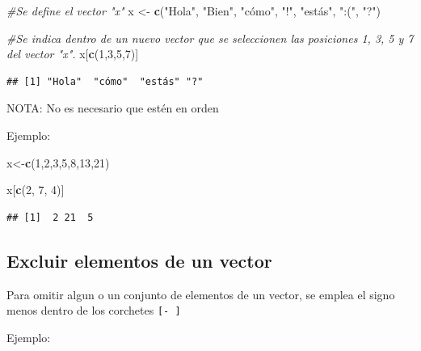\documentclass[
]{book}
\newenvironment{Shaded}{\begin{snugshade}}{\end{snugshade}}
\newcommand{\CommentTok}[1]{\textcolor[rgb]{0.56,0.35,0.01}{\textit{#1}}}
\newcommand{\DecValTok}[1]{\textcolor[rgb]{0.00,0.00,0.81}{#1}}
\newcommand{\FunctionTok}[1]{\textcolor[rgb]{0.13,0.29,0.53}{\textbf{#1}}}
\newcommand{\NormalTok}[1]{#1}
\newcommand{\OtherTok}[1]{\textcolor[rgb]{0.56,0.35,0.01}{#1}}
\newcommand{\StringTok}[1]{\textcolor[rgb]{0.31,0.60,0.02}{#1}}
\begin{document}
\begin{Shaded}
\begin{Highlighting}[]
\CommentTok{\#Se define el vector "x"}
\NormalTok{x }\OtherTok{\textless{}{-}} \FunctionTok{c}\NormalTok{(}\StringTok{"Hola"}\NormalTok{, }\StringTok{"Bien"}\NormalTok{, }\StringTok{"cómo"}\NormalTok{, }\StringTok{"!"}\NormalTok{, }\StringTok{"estás"}\NormalTok{, }\StringTok{":("}\NormalTok{, }\StringTok{"?"}\NormalTok{)}

\CommentTok{\#Se indica dentro de un nuevo vector que se seleccionen las posiciones 1, 3, 5 y 7 del vector "x". }
\NormalTok{x[}\FunctionTok{c}\NormalTok{(}\DecValTok{1}\NormalTok{,}\DecValTok{3}\NormalTok{,}\DecValTok{5}\NormalTok{,}\DecValTok{7}\NormalTok{)]}
\end{Highlighting}
\end{Shaded}

\begin{verbatim}
## [1] "Hola"  "cómo"  "estás" "?"
\end{verbatim}

NOTA: No es necesario que estén en orden

Ejemplo:

\begin{Shaded}
\begin{Highlighting}[]
\NormalTok{x}\OtherTok{\textless{}{-}}\FunctionTok{c}\NormalTok{(}\DecValTok{1}\NormalTok{,}\DecValTok{2}\NormalTok{,}\DecValTok{3}\NormalTok{,}\DecValTok{5}\NormalTok{,}\DecValTok{8}\NormalTok{,}\DecValTok{13}\NormalTok{,}\DecValTok{21}\NormalTok{)}

\NormalTok{x[}\FunctionTok{c}\NormalTok{(}\DecValTok{2}\NormalTok{, }\DecValTok{7}\NormalTok{, }\DecValTok{4}\NormalTok{)]}
\end{Highlighting}
\end{Shaded}

\begin{verbatim}
## [1]  2 21  5
\end{verbatim}

\hypertarget{excluir-elementos-de-un-vector}{%
\subsection{Excluir elementos de un vector}\label{excluir-elementos-de-un-vector}}

Para omitir algun o un conjunto de elementos de un vector, se emplea el signo menos dentro de los corchetes \texttt{{[}-\ {]}}

Ejemplo:
\end{document}
